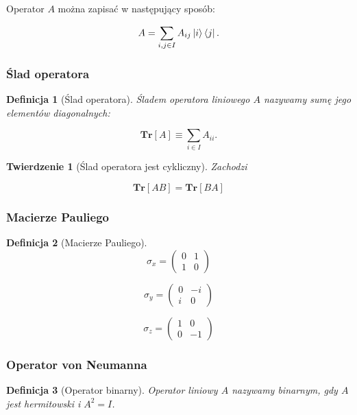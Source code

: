 \documentclass[a4paper,12pt]{article}
\newtheorem{definition}{Definicja}
\newtheorem{theorem}{Twierdzenie}
\begin{document}
Operator $A$ można zapisać w następujący sposób:

    $$
        A = \sum\limits_{i, j \in I} A_{ij} \ket{i} \bra{j}.
    $$

\subsubsection{Ślad operatora}

\begin{definition}[Ślad operatora]
    Śladem operatora liniowego $A$ nazywamy sumę jego elementów diagonalnych:

    $$
        \textbf{Tr}[A] \equiv \sum\limits_{i \in I} A_{ii}.
    $$
\end{definition}

\begin{theorem}[Ślad operatora jest cykliczny]
    Zachodzi

    $$
        \textbf{Tr}[AB] = \textbf{Tr}[BA]
    $$
\end{theorem}

\subsubsection{Macierze Pauliego}

\begin{definition}[Macierze Pauliego]
    $$
        \sigma_{x} =
        \begin{pmatrix}
            0 & 1 \\
            1 & 0
        \end{pmatrix}
    $$

    $$
        \sigma_{y} =
        \begin{pmatrix}
            0 & -i \\
            i & 0
        \end{pmatrix}
    $$

    $$
        \sigma_{z} =
        \begin{pmatrix}
            1 & 0 \\
            0 & -1
        \end{pmatrix}
    $$
\end{definition}

\subsubsection{Operator von Neumanna}

\begin{definition}[Operator binarny]
    Operator liniowy $A$ nazywamy binarnym, gdy $A$ jest hermitowski i $A ^ 2 = I$.
\end{definition}
\end{document}
